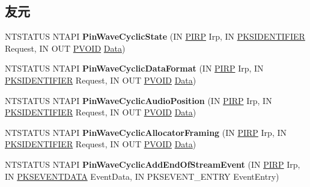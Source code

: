 \subsection*{友元}
\begin{DoxyCompactItemize}
\item 
\mbox{\label{class_c_port_pin_wave_cyclic_a56e027512087d3dc611d45c33c3c61c9}} 
N\+T\+S\+T\+A\+T\+US N\+T\+A\+PI {\bfseries Pin\+Wave\+Cyclic\+State} (IN \hyperlink{interfacevoid}{P\+I\+RP} Irp, IN \hyperlink{struct_k_s_i_d_e_n_t_i_f_i_e_r}{P\+K\+S\+I\+D\+E\+N\+T\+I\+F\+I\+ER} Request, IN O\+UT \hyperlink{interfacevoid}{P\+V\+O\+ID} \hyperlink{struct_data}{Data})
\item 
\mbox{\label{class_c_port_pin_wave_cyclic_ae69cf88f8d50dbf3a865c8011b54229f}} 
N\+T\+S\+T\+A\+T\+US N\+T\+A\+PI {\bfseries Pin\+Wave\+Cyclic\+Data\+Format} (IN \hyperlink{interfacevoid}{P\+I\+RP} Irp, IN \hyperlink{struct_k_s_i_d_e_n_t_i_f_i_e_r}{P\+K\+S\+I\+D\+E\+N\+T\+I\+F\+I\+ER} Request, IN O\+UT \hyperlink{interfacevoid}{P\+V\+O\+ID} \hyperlink{struct_data}{Data})
\item 
\mbox{\label{class_c_port_pin_wave_cyclic_a0e43cd91cf6d511f841b89dc2939b5e7}} 
N\+T\+S\+T\+A\+T\+US N\+T\+A\+PI {\bfseries Pin\+Wave\+Cyclic\+Audio\+Position} (IN \hyperlink{interfacevoid}{P\+I\+RP} Irp, IN \hyperlink{struct_k_s_i_d_e_n_t_i_f_i_e_r}{P\+K\+S\+I\+D\+E\+N\+T\+I\+F\+I\+ER} Request, IN O\+UT \hyperlink{interfacevoid}{P\+V\+O\+ID} \hyperlink{struct_data}{Data})
\item 
\mbox{\label{class_c_port_pin_wave_cyclic_ae3330160ad9880373bb9d74789ec10da}} 
N\+T\+S\+T\+A\+T\+US N\+T\+A\+PI {\bfseries Pin\+Wave\+Cyclic\+Allocator\+Framing} (IN \hyperlink{interfacevoid}{P\+I\+RP} Irp, IN \hyperlink{struct_k_s_i_d_e_n_t_i_f_i_e_r}{P\+K\+S\+I\+D\+E\+N\+T\+I\+F\+I\+ER} Request, IN O\+UT \hyperlink{interfacevoid}{P\+V\+O\+ID} \hyperlink{struct_data}{Data})
\item 
\mbox{\label{class_c_port_pin_wave_cyclic_a5fa46b6c7e19802c2997bca3a37c46f7}} 
N\+T\+S\+T\+A\+T\+US N\+T\+A\+PI {\bfseries Pin\+Wave\+Cyclic\+Add\+End\+Of\+Stream\+Event} (IN \hyperlink{interfacevoid}{P\+I\+RP} Irp, IN \hyperlink{struct_k_s_e_v_e_n_t_d_a_t_a}{P\+K\+S\+E\+V\+E\+N\+T\+D\+A\+TA} Event\+Data, IN P\+K\+S\+E\+V\+E\+N\+T\+\_\+\+E\+N\+T\+RY Event\+Entry)

\end{DoxyCompactItemize}
